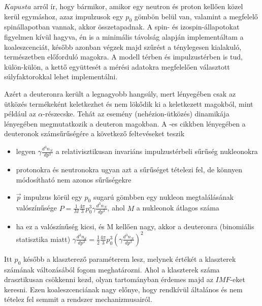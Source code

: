 \documentclass[a4paper,12pt]{article}
\begin{document}
\vspace{5mm}

\par $Kapusta$ \cite{kaposzta} arról ír, hogy bármikor, amikor egy neutron és proton kellően közel kerül egymáshoz, azaz impulzusok egy $p_{0}$ gömbön belül van, valamint a megfelelő spinállapotban vannak, akkor összetapadnak. A spin- és izospin-állapotokat figyelmen kívül hagyva, én is a minimális távolság alapján implementáltam a koaleszcenciát, később azonban végzek majd szűrést a ténylegesen kialakuló, természetben előforduló magokra. A modell térben és impulzustérben is tud, külön-külön, a kettő együttesét a mérési adatokra megfelelően választott súlyfaktorokkal lehet implementálni.

\vspace{5mm}

\par Azért a deuteronra került a legnagyobb hangsúly, mert lényegében csak az ütközés termékeként keletkezhet és nem lökődik ki a keletkezett magokból, mint például az $\alpha$-részecske. Tehát az esemény (nehézion-ütközés) dinamikája lényegében megmutatkozik a deuteron magokban. A \cite{kaposzta}-es cikkben lényegében a deuteronok számsűrűségére a következő feltevéseket teszik

\vspace{5mm}

\begin{itemize}
\item legyen $\gamma \frac{d^{3}n_{N}}{dp^{3}}$ a relativisztikusan invariáns impulzustérbeli sűrűség nukleonokra
\item protonokra és neutronokra ugyan azt a sűrűséget tételezi fel, de könnyen módosítható nem azonos sűrűségekre
\item $\vec{p}$ impulzus körül egy $p_{0}$ sugarú gömbben egy nukleon megtalálásának valószínűsége $P = \frac{1}{M}\frac{4\pi}{3}p_{0}^{3}\gamma \frac{d^{3}n_{N}}{dp^{3}}$, ahol $M$ a nukleonok átlagos száma
\item ha ez a valószínűség kicsi, és M kellően nagy, akkor a deuteronra (binomiális statisztika miatt) $\gamma \frac{d^{3}n_{d}}{dp^{3}} = \frac{1}{2}\frac{4\pi}{3}p_{0}^{3}(\gamma \frac{d^{3}n_{N}}{dp^{3}})^{2}$
\end{itemize}

\vspace{5mm}

\par Itt $p_{0}$ később a klaszterező paraméterem lesz, melynek értékét a klaszterek számának változásából fogom meghatározni. Ahol a klaszterek száma drasztikusan csökkenni kezd, olyan tartományban érdemes majd az $IMF$-eket keresni. Ezen koaleszcenciának nagy előnye, hogy rendkívül általános és nem tételez fel semmit a rendszer mechanizmusairól.
\end{document}
